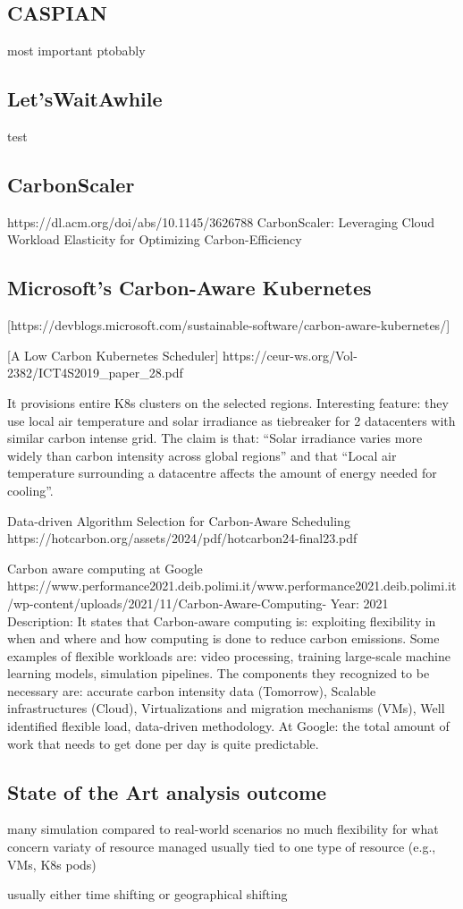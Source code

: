 \subsection{CASPIAN}

most important ptobably

\subsection{Let'sWaitAwhile}

test

\subsection{CarbonScaler}

https://dl.acm.org/doi/abs/10.1145/3626788
CarbonScaler: Leveraging Cloud Workload Elasticity for Optimizing Carbon-Efficiency

\subsection{Microsoft's Carbon-Aware Kubernetes}

[https://devblogs.microsoft.com/sustainable-software/carbon-aware-kubernetes/]


[A Low Carbon Kubernetes Scheduler]
https://ceur-ws.org/Vol-2382/ICT4S2019_paper_28.pdf

It provisions entire K8s clusters on the selected regions.
Interesting feature: they use local air temperature and solar irradiance as tiebreaker for 2 datacenters with similar carbon intense grid. The claim is that: “Solar irradiance varies more widely than carbon intensity across global regions” and that “Local air temperature surrounding a datacentre affects the amount of energy needed for cooling”. 



Data-driven Algorithm Selection for Carbon-Aware Scheduling
https://hotcarbon.org/assets/2024/pdf/hotcarbon24-final23.pdf


Carbon aware computing at Google
https://www.performance2021.deib.polimi.it/www.performance2021.deib.polimi.it/wp-content/uploads/2021/11/Carbon-Aware-Computing-%
Year: 2021
Description: 
It states that Carbon-aware computing is: exploiting flexibility in when and where and how computing is done to reduce carbon emissions.
Some examples of flexible workloads are: video processing, training large-scale machine learning models, simulation pipelines.
The components they recognized to be necessary are: accurate carbon intensity data (Tomorrow), Scalable infrastructures (Cloud), Virtualizations and migration mechanisms (VMs), Well identified flexible load, data-driven methodology.
At Google: the total amount of work that needs to get done per day is quite predictable.



\subsection{State of the Art analysis outcome}

many simulation compared to real-world scenarios
no much flexibility for what concern variaty of resource managed
usually tied to one type of resource (e.g., VMs, K8s pods)

usually either time shifting or geographical shifting

\newpage
